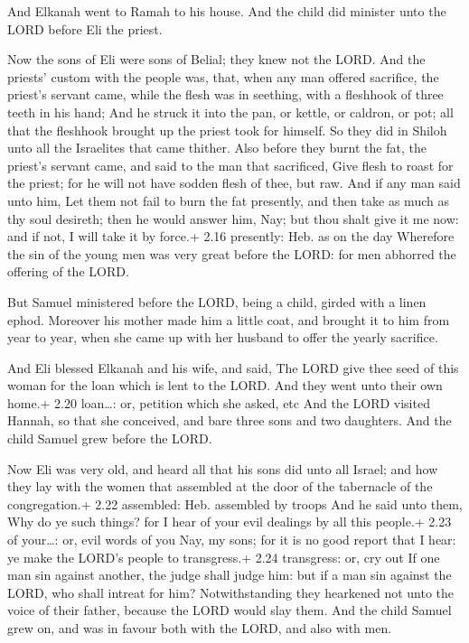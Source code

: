  And Elkanah went to Ramah to his house. And the child did
minister unto the LORD before Eli the priest.

 Now the sons of Eli were sons of Belial; they knew not
the LORD.  And the priests' custom with the people was,
that, when any man offered sacrifice, the priest's servant came, while
the flesh was in seething, with a fleshhook of three teeth in his hand;
 And he struck it into the pan, or kettle, or caldron, or
pot; all that the fleshhook brought up the priest took for himself. So
they did in Shiloh unto all the Israelites that came thither.
 Also before they burnt the fat, the priest's servant came,
and said to the man that sacrificed, Give flesh to roast for the priest;
for he will not have sodden flesh of thee, but raw.  And if
any man said unto him, Let them not fail to burn the fat presently, and
then take as much as thy soul desireth; then he would answer him, Nay;
but thou shalt give it me now: and if not, I will take it by force.+
2.16 presently: Heb. as on the day  Wherefore the sin of
the young men was very great before the LORD: for men abhorred the
offering of the LORD.

 But Samuel ministered before the LORD, being a child,
girded with a linen ephod.  Moreover his mother made him a
little coat, and brought it to him from year to year, when she came up
with her husband to offer the yearly sacrifice.

 And Eli blessed Elkanah and his wife, and said, The LORD
give thee seed of this woman for the loan which is lent to the LORD. And
they went unto their own home.+ 2.20 loan\ldots: or, petition which she
asked, etc  And the LORD visited Hannah, so that she
conceived, and bare three sons and two daughters. And the child Samuel
grew before the LORD.

 Now Eli was very old, and heard all that his sons did
unto all Israel; and how they lay with the women that assembled at the
door of the tabernacle of the congregation.+ 2.22 assembled: Heb.
assembled by troops  And he said unto them, Why do ye such
things? for I hear of your evil dealings by all this people.+ 2.23 of
your\ldots: or, evil words of you  Nay, my sons; for it is
no good report that I hear: ye make the LORD's people to transgress.+
2.24 transgress: or, cry out  If one man sin against
another, the judge shall judge him: but if a man sin against the LORD,
who shall intreat for him? Notwithstanding they hearkened not unto the
voice of their father, because the LORD would slay them. 
And the child Samuel grew on, and was in favour both with the LORD, and
also with men.

